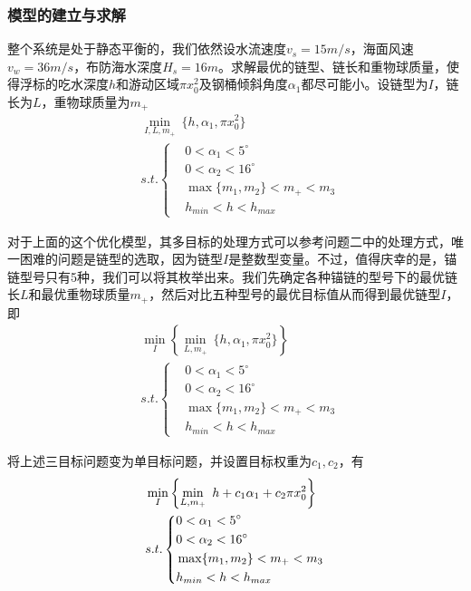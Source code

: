         \subsubsection{模型的建立与求解}
            \par
            整个系统是处于静态平衡的，我们依然设水流速度$v_s=15m/s$，海面风速$v_w=36m/s$，布防海水深度$H_s=16m$。求解最优的链型、链长和重物球质量，使得浮标的吃水深度$h$和游动区域$\pi x_0^2$及钢桶倾斜角度$\alpha_1$都尽可能小。设链型为$I$，链长为$L$，重物球质量为$m_+$
            \begin{align*}
            & \min_{I,L,m_+} \ \{h,\alpha_1,\pi x_0^2\}\\
            & s.t.\left\{
            \begin{aligned}
            & 0<\alpha_1<5^\circ\\
            & 0<\alpha_2<16^\circ\\
            & \max\{m_1,m_2\}<m_+<m_3\\
            & h_{min}<h<h_{max}
            \end{aligned}
            \right.
            \end{align*}
            \par
            对于上面的这个优化模型，其多目标的处理方式可以参考问题二中的处理方式，唯一困难的问题是链型的选取，因为链型$I$是整数型变量。不过，值得庆幸的是，锚链型号只有5种，我们可以将其枚举出来。我们先确定各种锚链的型号下的最优链长$L$和最优重物球质量$m_+$，然后对比五种型号的最优目标值从而得到最优链型$I$，即
            \begin{align*}
            & \min_{I}\left\{\min_{L,m_+}\ \{h,\alpha_1,\pi x_0^2\}\right\} \\
            & s.t.\left\{
            \begin{aligned}
            & 0<\alpha_1<5^\circ\\
            & 0<\alpha_2<16^\circ\\
            & \max\{m_1,m_2\}<m_+<m_3\\
            & h_{min}<h<h_{max}
            \end{aligned}
            \right.
            \end{align*}
            \par
            将上述三目标问题变为单目标问题，并设置目标权重为$c_1,c_2$，有
            \begin{align}
            \label{系泊系统优化模型5}
            & \min_{I}\left\{\min_{L,m_+}\ h+c_1\alpha_1+c_2\pi x_0^2\right\} \\
            & s.t.\left\{
            \begin{aligned}
            & 0<\alpha_1<5^\circ\\
            & 0<\alpha_2<16^\circ\\
            & \max\{m_1,m_2\}<m_+<m_3\\
            & h_{min}<h<h_{max}
            \end{aligned}
            \right.\notag
            \end{align}
